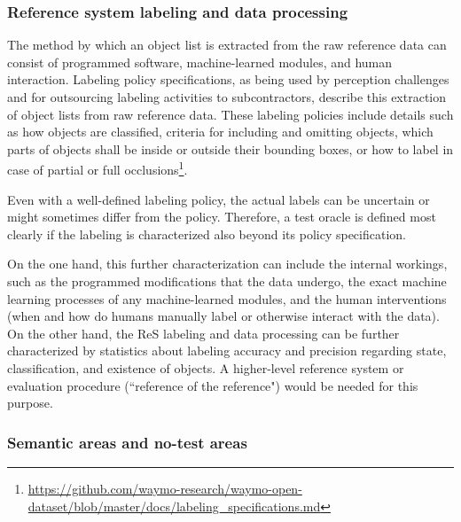 \documentclass[conference]{IEEEtran}
\begin{document}
\subsubsection{Reference system labeling and data processing}
\label{sec:ref_processing}

The method by which an object list is extracted from the raw reference data %
can consist of programmed software, machine-learned modules, and human interaction. 
Labeling policy specifications, as being used by perception challenges and for outsourcing labeling activities to subcontractors, describe this extraction of object lists from raw reference data. 
These labeling policies include details such as how objects are classified, criteria for including and omitting objects, which parts of objects shall be inside or outside their bounding boxes, or how to label in case of partial or full occlusions\footnote{\url{https://github.com/waymo-research/waymo-open-dataset/blob/master/docs/labeling_specifications.md}}.

Even with a well-defined labeling policy, the actual labels can be uncertain \cite{wang2020inferring} or might sometimes differ from the policy. 
Therefore, a test oracle is defined most clearly if the labeling is characterized also beyond its policy specification.

On the one hand, this further characterization can include the internal workings, such as 
the programmed modifications that the data undergo, the exact machine learning processes of any machine-learned modules, and the human interventions (when and how do humans manually label or otherwise interact with the data).
On the other hand, the ReS labeling and data processing can be further characterized by statistics about labeling accuracy and precision regarding state, classification, and existence of objects.
A higher-level reference system or evaluation procedure (``reference of the reference") would be needed for this purpose.


\subsubsection{Semantic areas and no-test areas}
\label{sec:semantic_areas}
\end{document}
